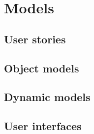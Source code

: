 \section{Models}

\subsection{User stories}

\subsection{Object models}

\subsection{Dynamic models}

\subsection{User interfaces}